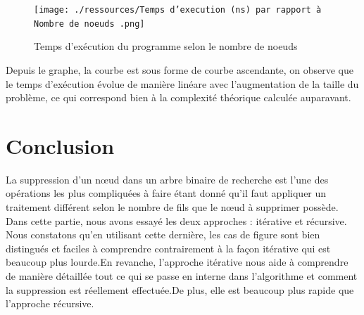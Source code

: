 \begin{figure}[H]
    \centering
        \texttt{[image: ./ressources/Temps d'execution (ns) par rapport à Nombre de noeuds .png]}
        \caption{Temps d'exécution du programme selon le nombre de noeuds}
    \label{fig:temps_exec_noeuds}
\end{figure}
\par
Depuis le graphe, la courbe est sous forme de courbe ascendante, on observe que le temps d'exécution évolue de manière linéare avec l'augmentation de la taille du problème, ce qui correspond bien à la complexité théorique calculée auparavant. 

\section{Conclusion}
La suppression d’un nœud dans un arbre binaire de recherche est l’une des opérations les plus compliquées à faire étant donné qu’il faut appliquer un traitement différent selon le nombre de fils que le nœud à supprimer possède.  Dans cette partie, nous avons essayé les deux approches : itérative et récursive. Nous constatons qu’en utilisant cette dernière, les cas de figure sont bien distingués et faciles à comprendre contrairement à la façon itérative qui est beaucoup plus lourde.En revanche, l'approche itérative nous aide à comprendre de manière détaillée tout ce qui se passe en interne dans l'algorithme et comment la suppression est réellement effectuée.De plus, elle est beaucoup plus rapide que l'approche récursive.